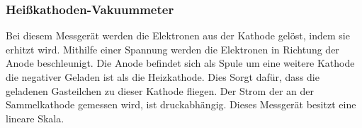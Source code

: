 \subsubsection{Heißkathoden-Vakuummeter}
Bei diesem Messgerät werden die Elektronen aus der Kathode gelöst, indem sie erhitzt wird. Mithilfe einer Spannung werden die Elektronen in Richtung der Anode beschleunigt. Die Anode befindet sich als Spule um eine weitere Kathode die negativer Geladen ist als die Heizkathode. Dies Sorgt dafür, dass die geladenen Gasteilchen zu dieser Kathode fliegen. Der Strom der an der Sammelkathode gemessen wird, ist druckabhängig. Dieses Messgerät besitzt eine lineare Skala.